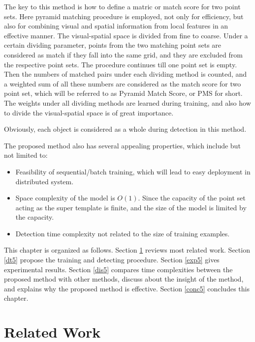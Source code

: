 \documentclass[paper]{ieice}
\begin{document}
 The key to this method is how to define a matric or match score for two point sets. Here pyramid matching procedure is employed, not only for efficiency, but also for combining visual and spatial information from local features in an effective manner. The visual-spatial space is divided from fine to coarse. Under a certain dividing parameter, points from the two matching point sets are considered as match if they fall into the same grid, and they are excluded from the respective point sets. The procedure continues till one point set is empty. Then the numbers of matched pairs under each dividing method is counted, and a weighted sum of all these numbers are considered as the match score for two point set, which will be referred to as Pyramid Match Score, or PMS for short. The weights under all dividing methods are learned during training, and also how to divide the visual-spatial space is of great importance.

Obviously, each object is considered as a whole during detection in this method.

The proposed method also has several appealing properties, which include but not limited to:
\begin{itemize}
\item {Feasibility of sequential/batch training, which will lead to easy deployment in distributed system.}
\item {Space complexity of the model is $O(1)$. Since the capacity of the point set acting as the super template is finite, and the size of the model is limited by the capacity.}
\item {Detection time complexity not related to the size of training examples.}
\end{itemize}

This chapter is organized as follows. Section
 \ref{rw5} reviews most related work. Section \ref{dt5} propose the training and detecting procedure. Section \ref{exp5} gives experimental results. Section \ref{dis5} compares time complexities between the proposed method with other methods, discuss about the insight of the method, and explains why the proposed method is effective. Section \ref{conc5} concludes this chapter.

\section{Related Work}
\label{rw5}
\end{document}
